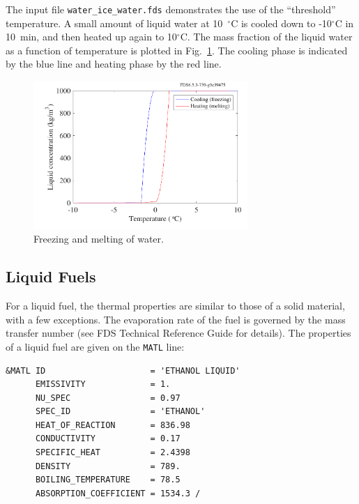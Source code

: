 \documentclass[11pt]{book}
\newcommand{\ct}{\tt\small}
\begin{document}
The input file {\ct water\_ice\_water.fds} demonstrates the use of the ``threshold'' temperature. A small amount of liquid water at 10~$^\circ$C is cooled down to -10$^\circ$C in 10~min, and then heated up again to 10$^\circ$C. The mass fraction of the liquid water as a function of temperature is plotted in Fig.~\ref{water_ice_water_plot}. The cooling phase is indicated by the blue line and heating phase by the red line.

\begin{figure}[ht]
\begin{center}
\includegraphics[width=3.2in]{SCRIPT_FIGURES/water_ice_water}
\end{center}
\caption[Results of the {\ct water\_ice\_water} test case]{Freezing and melting of water.}
\label{water_ice_water_plot}
\end{figure}




\subsection{Liquid Fuels}
\label{info:liquid_fuels}

For a liquid fuel, the thermal properties are similar to those of a solid
material, with a few exceptions. The evaporation rate of the fuel
is governed by the mass transfer number (see FDS Technical Reference
Guide for details). The properties of a liquid fuel are given on the {\ct MATL} line:

\footnotesize
\begin{verbatim}
&MATL ID                     = 'ETHANOL LIQUID'
      EMISSIVITY             = 1.
      NU_SPEC                = 0.97
      SPEC_ID                = 'ETHANOL'
      HEAT_OF_REACTION       = 836.98
      CONDUCTIVITY           = 0.17
      SPECIFIC_HEAT          = 2.4398
      DENSITY                = 789.
      BOILING_TEMPERATURE    = 78.5
      ABSORPTION_COEFFICIENT = 1534.3 /
\end{verbatim} \normalsize
\end{document}

